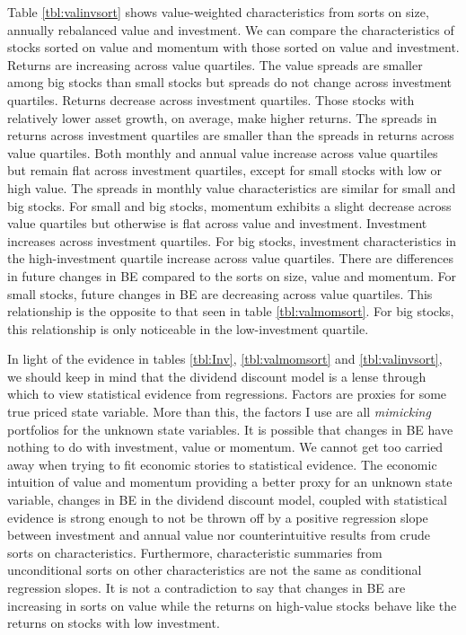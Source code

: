 Table \ref{tbl:valinvsort} shows value-weighted characteristics from sorts on size,
annually rebalanced value and investment. We can compare the characteristics of stocks
sorted on value and momentum with those sorted on value and investment. Returns are
increasing across value quartiles. The value spreads are smaller among big stocks than
small stocks but spreads do not change across investment quartiles. Returns decrease
across investment quartiles. Those stocks with relatively lower asset growth, on average,
make higher returns. The spreads in returns across investment quartiles are smaller than
the spreads in returns across value quartiles. Both monthly and annual value increase
across value quartiles but remain flat across investment quartiles, except for small
stocks with low or high value. The spreads in monthly value characteristics are similar
for small and big stocks. For small and big stocks, momentum exhibits a slight decrease
across value quartiles but otherwise is flat across value and investment. Investment
increases across investment quartiles. For big stocks, investment characteristics in the
high-investment quartile increase across value quartiles. There are differences in future
changes in BE compared to the sorts on size, value and momentum. For small stocks, future
changes in BE are decreasing across value quartiles. This relationship is the opposite to
that seen in table \ref{tbl:valmomsort}. For big stocks, this relationship is only
noticeable in the low-investment quartile.

In light of the evidence in tables \ref{tbl:Inv}, \ref{tbl:valmomsort} and
\ref{tbl:valinvsort}, we should keep in mind that the dividend discount model is a lense
through which to view statistical evidence from regressions. Factors are proxies for some
true priced state variable. More than this, the factors I use are all \emph{mimicking}
portfolios for the unknown state variables. It is possible that changes in BE have nothing
to do with investment, value or momentum. We cannot get too carried away when trying to
fit economic stories to statistical evidence. The economic intuition of value and momentum
providing a better proxy for an unknown state variable, changes in BE in the dividend
discount model, coupled with statistical evidence is strong enough to not be thrown off by
a positive regression slope between investment and annual value nor counterintuitive
results from crude sorts on characteristics. Furthermore, characteristic summaries from
unconditional sorts on other characteristics are not the same as conditional regression
slopes. It is not a contradiction to say that changes in BE are increasing in sorts on
value while the returns on high-value stocks behave like the returns on stocks with low
investment.
